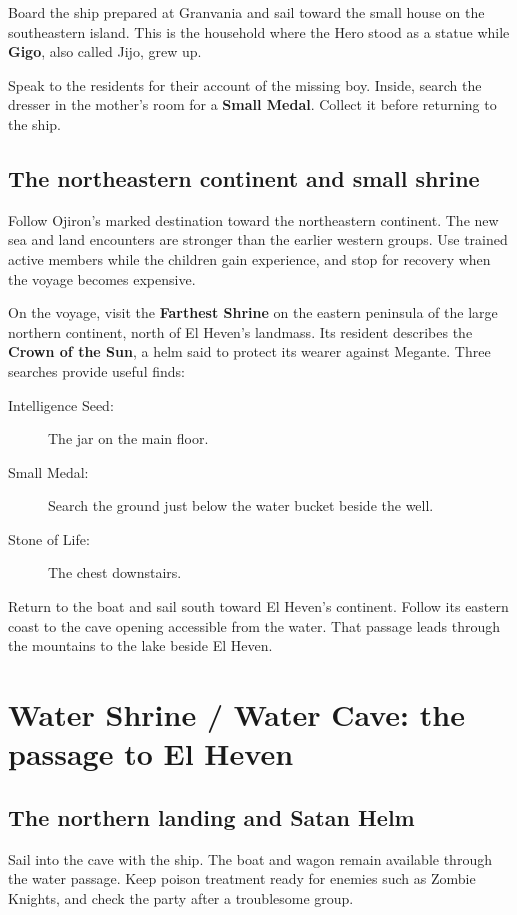 Board the ship prepared at Granvania and sail toward the small
house on the southeastern island. This is the household where the
Hero stood as a statue while \textbf{Gigo}, also called Jijo,
grew up.

Speak to the residents for their account of the missing boy.
Inside, search the dresser in the mother's room for a
\textbf{Small Medal}. Collect it before returning to the ship.

\subsection*{The northeastern continent and small shrine}

Follow Ojiron's marked destination toward the northeastern continent.
The new sea and land encounters are stronger than the earlier
western groups. Use trained active members while the children gain
experience, and stop for recovery when the voyage becomes expensive.

On the voyage, visit the \textbf{Farthest Shrine} on the eastern
peninsula of the large northern continent, north of El Heven's
landmass. Its resident describes
the \textbf{Crown of the Sun}, a helm said to protect its wearer
against Megante. Three searches provide useful finds:
\begin{description}
  \item[Intelligence Seed:] The jar on the main floor.
  \item[Small Medal:] Search the ground just below the water bucket
    beside the well.
  \item[Stone of Life:] The chest downstairs.
\end{description}

Return to the boat and sail south toward El Heven's continent.
Follow its eastern coast to the cave opening accessible from
the water. That passage leads
through the mountains to the lake beside El Heven.

\section{Water Shrine / Water Cave: the passage to El Heven}

\subsection*{The northern landing and Satan Helm}

Sail into the cave with the ship. The boat and wagon remain available
through the water passage. Keep poison treatment ready for enemies
such as Zombie Knights, and check the party after a troublesome group.

